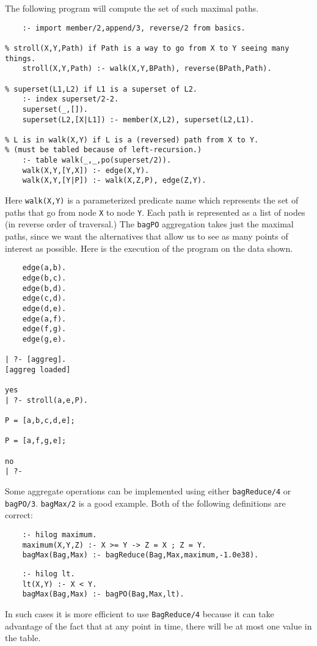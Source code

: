 The following program will compute the set of such maximal paths.
\begin{verbatim}
    :- import member/2,append/3, reverse/2 from basics.

% stroll(X,Y,Path) if Path is a way to go from X to Y seeing many things.
    stroll(X,Y,Path) :- walk(X,Y,BPath), reverse(BPath,Path).

% superset(L1,L2) if L1 is a superset of L2.
    :- index superset/2-2.
    superset(_,[]).
    superset(L2,[X|L1]) :- member(X,L2), superset(L2,L1).

% L is in walk(X,Y) if L is a (reversed) path from X to Y.
% (must be tabled because of left-recursion.)
    :- table walk(_,_,po(superset/2)).
    walk(X,Y,[Y,X]) :- edge(X,Y).
    walk(X,Y,[Y|P]) :- walk(X,Z,P), edge(Z,Y).
\end{verbatim}

Here \verb|walk(X,Y)| is a parameterized predicate name which
represents the set of paths that go from node \verb|X| to node
\verb|Y|.  Each path is represented as a list of nodes (in reverse
order of traversal.)  The \verb|bagPO| aggregation takes just the
maximal paths, since we want the alternatives that allow us to see as
many points of interest as possible.  Here is the execution of the
program on the data shown.
\begin{verbatim}
    edge(a,b).
    edge(b,c).
    edge(b,d).
    edge(c,d).
    edge(d,e).
    edge(a,f).
    edge(f,g).
    edge(g,e).

| ?- [aggreg].
[aggreg loaded]

yes
| ?- stroll(a,e,P).

P = [a,b,c,d,e];

P = [a,f,g,e];

no
| ?- 
\end{verbatim}

Some aggregate operations can be implemented using either
\verb|bagReduce/4| or \verb|bagPO/3|.  \verb|bagMax/2| is a good
example. Both of the following definitions are correct:
\begin{verbatim}
    :- hilog maximum.
    maximum(X,Y,Z) :- X >= Y -> Z = X ; Z = Y.
    bagMax(Bag,Max) :- bagReduce(Bag,Max,maximum,-1.0e38).
\end{verbatim}

\begin{verbatim}
    :- hilog lt.
    lt(X,Y) :- X < Y.
    bagMax(Bag,Max) :- bagPO(Bag,Max,lt).
\end{verbatim}

In such cases it is more efficient to use \verb|BagReduce/4| because
it can take advantage of the fact that at any point in time, there
will be at most one value in the table.

